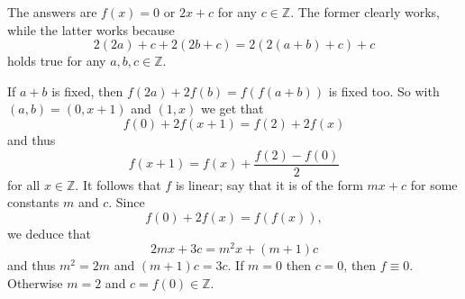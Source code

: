 The answers are $f(x)=0$ or $2x+c$ for any $c\in\mathbb{Z}$. The former clearly works, while the latter works because \[2(2a)+c+2(2b+c)=2(2(a+b)+c)+c\] holds true for any $a,b,c\in\mathbb{Z}$.

If $a+b$ is fixed, then $f(2a)+2f(b)=f(f(a+b))$ is fixed too. So with $(a,b)=(0,x+1)$ and $(1,x)$ we get that \[f(0)+2f(x+1)=f(2)+2f(x)\] and thus \[f(x+1)=f(x)+\frac{f(2)-f(0)}{2}\] for all $x\in\mathbb{Z}$. It follows that $f$ is linear; say that it is of the form $mx+c$ for some constants $m$ and $c$. Since \[f(0)+2f(x)=f(f(x)),\] we deduce that \[2mx+3c=m^2x+(m+1)c\] and thus $m^2=2m$ and $(m+1)c=3c$. If $m=0$ then $c=0$, then $f\equiv0$. Otherwise $m=2$ and $c=f(0)\in\mathbb{Z}$.
